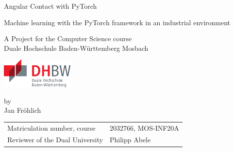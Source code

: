 \def\doctype{Studienarbeit T3\_3101}
\def\title{Angular Contact with PyTorch}
\def\subtitle{Machine learning with the PyTorch framework in an industrial environment}
\def\author{Jan Fröhlich}

\begin{titlepage}

	\vspace{10mm}

	\begin{center}
		\vspace*{3mm}

		\huge \title

		\vspace{42.6pt}

		\large \subtitle

		\vspace{42.6pt}

		\small A Project for the Computer Science course \\
		\vspace{7.1pt}
		\large Duale Hochschule Baden-Württemberg Mosbach

		\vspace{14.2pt}

		\includegraphics[height=1.5cm]{assets/logo-dhbw.eps}

		\vspace{42.6pt}

		\small by \\
		\large \author
	\end{center}

	\vspace{98.6pt}

	\begin{table}[h]
		\centering
		\begin{tabular}{ll}
			\small Matriculation number, course    & 2032766, MOS-INF20A        \\
			\small Reviewer of the Dual University & Philipp Abele              \\
		\end{tabular}
	\end{table}

	\vspace{49.7pt}


\end{titlepage}
